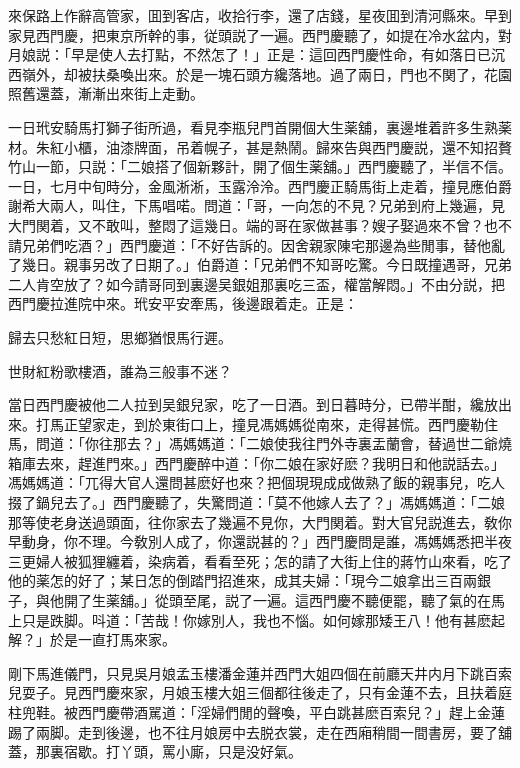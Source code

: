 來保路上作辭高管家，囬到客店，收拾行李，還了店錢，星夜囬到清河縣來。早到家見西門慶，把東京所幹的事，従頭説了一遍。西門慶聽了，如提在冷水盆内，對月娘説：「早是使人去打點，不然怎了！」正是：這回西門慶性命，有如落日已沉西嶺外，却被扶桑喚出來。於是一塊石頭方纔落地。過了兩日，門也不関了，花園照舊還蓋，漸漸出來街上走動。

一日玳安騎馬打獅子街所過，看見李瓶兒門首開個大生薬舖，裏邊堆着許多生熟薬材。朱紅小櫃，油漆牌面，吊着幌子，甚是熱鬧。歸來告與西門慶説，還不知招贅竹山一節，只説：「二娘搭了個新夥計，開了個生薬舖。」西門慶聽了，半信不信。一日，七月中旬時分，金風淅淅，玉露泠泠。西門慶正騎馬街上走着，撞見應伯爵謝希大兩人，叫住，下馬唱喏。問道：「哥，一向怎的不見？兄弟到府上幾遍，見大門関着，又不敢叫，整悶了這幾日。端的哥在家做甚事？嫂子娶過來不曾？也不請兄弟們吃酒？」西門慶道：「不好告訴的。因舍親家陳宅那邊為些閒事，替他亂了幾日。親事另改了日期了。」伯爵道：「兄弟們不知哥吃驚。今日既撞遇哥，兄弟二人肯空放了？如今請哥同到裏邊吴銀姐那裏吃三盃，權當解悶。」不由分説，把西門慶拉進院中來。玳安平安牽馬，後邊跟着走。正是：

歸去只愁紅日短，思鄉猶恨馬行遲。

世財紅粉歌樓酒，誰為三般事不迷？

當日西門慶被他二人拉到吴銀兒家，吃了一日酒。到日暮時分，已帶半酣，纔放出來。打馬正望家走，到於東街口上，撞見馮媽媽從南來，走得甚慌。西門慶勒住馬，問道：「你往那去？」馮媽媽道：「二娘使我往門外寺裏盂蘭會，替過世二爺燒箱庫去來，趕進門來。」西門慶醉中道：「你二娘在家好麽？我明日和他説話去。」馮媽媽道：「兀得大官人還問甚麽好也來？把個現現成成做熟了飯的親事兒，吃人掇了鍋兒去了。」西門慶聽了，失驚問道：「莫不他嫁人去了？」馮媽媽道：「二娘那等使老身送過頭面，往你家去了幾遍不見你，大門関着。對大官兒説進去，敎你早動身，你不理。今敎別人成了，你還説甚的？」西門慶問是誰，馮媽媽悉把半夜三更婦人被狐狸纏着，染病着，看看至死；怎的請了大街上住的蔣竹山來看，吃了他的薬怎的好了；某日怎的倒踏門招進來，成其夫婦：「現今二娘拿出三百兩銀子，與他開了生薬舖。」從頭至尾，説了一遍。這西門慶不聽便罷，聽了氣的在馬上只是跌脚。呌道：「苦哉！你嫁別人，我也不惱。如何嫁那矮王八！他有甚麽起解？」於是一直打馬來家。

剛下馬進儀門，只見吳月娘孟玉樓潘金蓮并西門大姐四個在前廳天井内月下跳百索兒耍子。見西門慶來家，月娘玉樓大姐三個都往後走了，只有金蓮不去，且扶着庭柱兜鞋。被西門慶帶酒駡道：「淫婦們閒的聲喚，平白跳甚麽百索兒？」趕上金蓮踢了兩脚。走到後邊，也不往月娘房中去脱衣裳，走在西廂稍間一間書房，要了舖蓋，那裏宿歇。打丫頭，罵小廝，只是没好氣。

